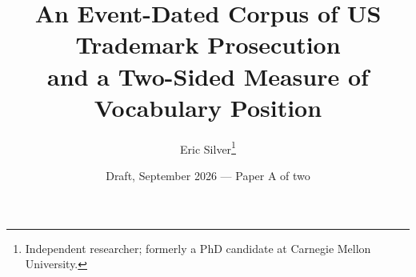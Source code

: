 
\newcommand{\onlineappendixnote}{\url{https://aporia.institute/tm-vocabulary/online-appendix/themes_T50.html}}
\graphicspath{{../../}}
\makeatletter{}\makeatother
\title{\bfseries An Event-Dated Corpus of US Trademark Prosecution\\
\large and a Two-Sided Measure of Vocabulary Position}
\author{Eric Silver\thanks{Independent researcher; formerly a PhD candidate
at Carnegie Mellon University.}}
\date{Draft, September 2026 --- Paper A of two}


\maketitle






















